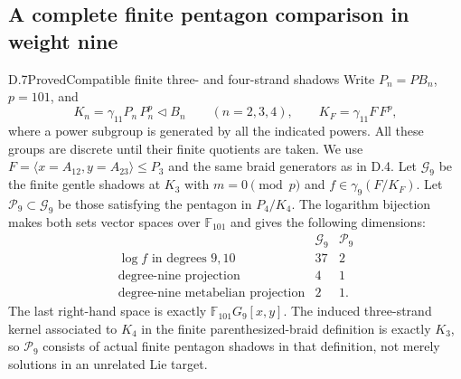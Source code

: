 \subsection{A complete finite pentagon comparison in weight nine}

\begin{statement}{D.7}{Proved}{Compatible finite three- and four-strand shadows}
Write $P_n=PB_n$, $p=101$, and
\[
 K_n=\gamma_{11}P_n\,P_n^p\triangleleft B_n\qquad(n=2,3,4),
 \qquad K_F=\gamma_{11}F\,F^p,
\]
where a power subgroup is generated by all the indicated powers.
All these groups are discrete until their finite quotients are taken.
We use $F=\langle x=A_{12},y=A_{23}\rangle\le P_3$ and the same
braid generators as in D.4. Let $\mathcal G_9$ be the finite gentle
shadows at $K_3$ with $m=0\pmod p$ and
$f\in\gamma_9(F/K_F)$. Let $\mathcal P_9\subset\mathcal G_9$ be
those satisfying the pentagon in $P_4/K_4$.
The logarithm bijection makes both sets vector spaces over
$\mathbb F_{101}$ and gives the following dimensions:
\[
\begin{array}{c|rr}
 &\mathcal G_9&\mathcal P_9\\\hline
 \log f\text{ in degrees }9,10&37&2\\
 \text{degree-nine projection}&4&1\\
 \text{degree-nine metabelian projection}&2&1.
\end{array}
\tag{D.7.1}
\]
The last right-hand space is exactly $\mathbb F_{101}G_9[x,y]$.
The induced three-strand kernel associated to $K_4$ in the finite
parenthesized-braid definition is exactly $K_3$, so
$\mathcal P_9$ consists of actual finite pentagon shadows in that
definition, not merely solutions in an unrelated Lie target.
\end{statement}
